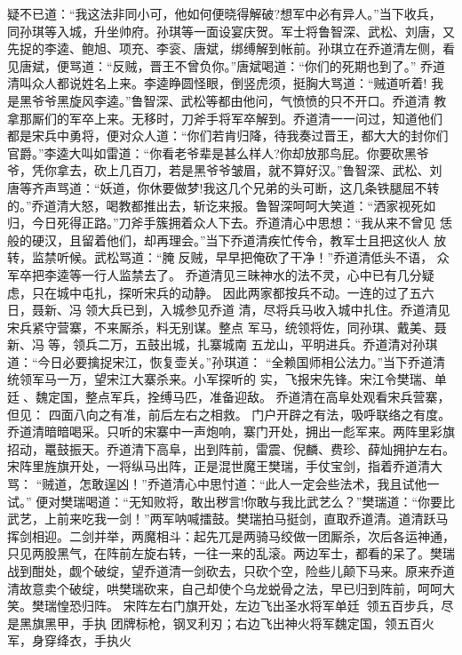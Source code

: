 疑不已道：“我这法非同小可，他如何便晓得解破?想军中必有异人。”当下收兵，
同孙琪等入城，升坐帅府。孙琪等一面设宴庆贺。军士将鲁智深、武松、刘唐，又
先捉的李逵、鲍旭、项充、李衮、唐斌，绑缚解到帐前。孙琪立在乔道清左侧，看
见唐斌，便骂道：“反贼，晋王不曾负你。”唐斌喝道：“你们的死期也到了。”
乔道清叫众人都说姓名上来。李逵睁圆怪眼，倒竖虎须，挺胸大骂道：“贼道听着!
我是黑爷爷黑旋风李逵。”鲁智深、武松等都由他问，气愤愤的只不开口。乔道清
教拿那厮们的军卒上来。无移时，刀斧手将军卒解到。乔道清一一问过，知道他们
都是宋兵中勇将，便对众人道：“你们若肯归降，待我奏过晋王，都大大的封你们
官爵。”李逵大叫如雷道：“你看老爷辈是甚么样人?你却放那鸟屁。你要砍黑爷
爷，凭你拿去，砍上几百刀，若是黑爷爷皱眉，就不算好汉。”鲁智深、武松、刘
唐等齐声骂道：“妖道，你休要做梦!我这几个兄弟的头可断，这几条铁腿屈不转
的。”乔道清大怒，喝教都推出去，斩讫来报。鲁智深呵呵大笑道：“洒家视死如
归，今日死得正路。”刀斧手簇拥着众人下去。乔道清心中思想：“我从来不曾见
恁般的硬汉，且留着他们，却再理会。”当下乔道清疾忙传令，教军士且把这伙人
放转，监禁听候。武松骂道：“腌反贼，早早把俺砍了干净！”乔道清低头不语，
众军卒把李逵等一行人监禁去了。
乔道清见三昧神水的法不灵，心中已有几分疑虑，只在城中屯扎，探听宋兵的动静。
因此两家都按兵不动。一连的过了五六日，聂新、冯领大兵已到，入城参见乔道
清，尽将兵马收入城中扎住。乔道清见宋兵紧守营寨，不来厮杀，料无别谋。整点
军马，统领将佐，同孙琪、戴美、聂新、冯等，领兵二万，五鼓出城，扎寨城南
五龙山，平明进兵。乔道清对孙琪道：“今日必要擒捉宋江，恢复壶关。”孙琪道：
“全赖国师相公法力。”当下乔道清统领军马一万，望宋江大寨杀来。小军探听的
实，飞报宋先锋。宋江令樊瑞、单廷、魏定国，整点军兵，拴缚马匹，准备迎敌。
乔道清在高阜处观看宋兵营寨，但见：
四面八向之有准，前后左右之相救。
门户开辟之有法，吸呼联络之有度。
乔道清暗暗喝采。只听的宋寨中一声炮响，寨门开处，拥出一彪军来。两阵里彩旗
招动，鼍鼓振天。乔道清下高阜，出到阵前，雷震、倪麟、费珍、薛灿拥护左右。
宋阵里旌旗开处，一将纵马出阵，正是混世魔王樊瑞，手仗宝剑，指着乔道清大骂：
“贼道，怎敢逞凶！”乔道清心中思忖道：“此人一定会些法术，我且试他一试。”
便对樊瑞喝道：“无知败将，敢出秽言!你敢与我比武艺么？”樊瑞道：“你要比
武艺，上前来吃我一剑！”两军呐喊擂鼓。樊瑞拍马挺剑，直取乔道清。道清跃马
挥剑相迎。二剑并举，两魔相斗：起先兀是两骑马绞做一团厮杀，次后各运神通，
只见两股黑气，在阵前左旋右转，一往一来的乱滚。两边军士，都看的呆了。樊瑞
战到酣处，觑个破绽，望乔道清一剑砍去，只砍个空，险些儿颠下马来。原来乔道
清故意卖个破绽，哄樊瑞砍来，自己却使个乌龙蜕骨之法，早已归到阵前，呵呵大
笑。樊瑞惶恐归阵。
宋阵左右门旗开处，左边飞出圣水将军单廷，领五百步兵，尽是黑旗黑甲，手执
团牌标枪，钢叉利刃；右边飞出神火将军魏定国，领五百火军，身穿绛衣，手执火
